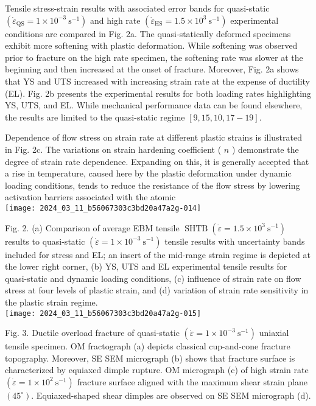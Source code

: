 \documentclass[10pt]{article}
\begin{document}
Tensile stress-strain results with associated error bands for quasi-static $\left(\dot{\varepsilon}_{\mathrm{QS}}=1 \times 10^{-3} \mathrm{~s}^{-1}\right)$ and high rate $\left(\dot{\varepsilon}_{\mathrm{HS}}=1.5 \times 10^{3} \mathrm{~s}^{-1}\right)$ experimental conditions are compared in Fig. 2a. The quasi-statically deformed specimens exhibit more softening with plastic deformation. While softening was observed prior to fracture on the high rate specimen, the softening rate was slower at the beginning and then increased at the onset of fracture. Moreover, Fig. 2a shows that YS and UTS increased with increasing strain rate at the expense of ductility (EL). Fig. 2b presents the experimental results for both loading rates highlighting YS, UTS, and EL. While mechanical performance data can be found elsewhere, the results are limited to the quasi-static regime $[9,15,10,17-19]$.

Dependence of flow stress on strain rate at different plastic strains is illustrated in Fig. 2c. The variations on strain hardening coefficient ( $n$ ) demonstrate the degree of strain rate dependence. Expanding on this, it is generally accepted that a rise in temperature, caused here by the plastic deformation under dynamic loading conditions, tends to reduce the resistance of the flow stress by lowering activation barriers associated with the atomic\\
\texttt{[image: 2024\_03\_11\_b56067303c3bd20a47a2g-014]}

Fig. 2. (a) Comparison of average EBM tensile $\operatorname{SHTB}\left(\dot{\varepsilon}=1.5 \times 10^{3} \mathrm{~s}^{-1}\right)$ results to quasi-static $\left(\dot{\varepsilon}=1 \times 10^{-3} \mathrm{~s}^{-1}\right)$ tensile results with uncertainty bands included for stress and EL; an insert of the mid-range strain regime is depicted at the lower right corner, (b) YS, UTS and EL experimental tensile results for quasi-static and dynamic loading conditions, (c) influence of strain rate on flow stress at four levels of plastic strain, and (d) variation of strain rate sensitivity in the plastic strain regime.\\
\texttt{[image: 2024\_03\_11\_b56067303c3bd20a47a2g-015]}

Fig. 3. Ductile overload fracture of quasi-static $\left(\dot{\varepsilon}=1 \times 10^{-3} \mathrm{~s}^{-1}\right)$ uniaxial tensile specimen. OM fractograph (a) depicts classical cup-and-cone fracture topography. Moreover, SE SEM micrograph (b) shows that fracture surface is characterized by equiaxed dimple rupture. OM micrograph (c) of high strain rate $\left(\dot{\varepsilon}=1 \times 10^{2} \mathrm{~s}^{-1}\right)$ fracture surface aligned with the maximum shear strain plane $\left(45^{\circ}\right)$. Equiaxed-shaped shear dimples are observed on SE SEM micrograph (d).
\end{document}
